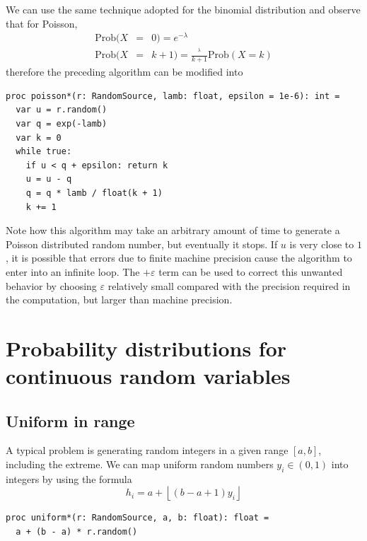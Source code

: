 \documentclass[justified, sixbynine]{tufte-book}
\def\ft{\small\tt}
\theoremstyle{plain}%
\newtheorem * {corollary}{Corollary}
\theoremstyle{definition}
\theoremstyle{remark}
\newtheorem * {remark}{Remark}
\newtheorem * {note}{Note}
\begin{document}
\begin{fullwidth}
We can use the same technique adopted for the
binomial distribution and observe that for Poisson, 
\begin{eqnarray}
\textrm{Prob}(X &=&0)=e^{-\lambda } \\
\textrm{Prob}(X &=&k+1)=\frac{^\lambda }{k+1}\textrm{Prob}(X=k)
\end{eqnarray}
therefore the preceding algorithm can be modified into

\begin{lstlisting}[caption={in file: {\ft nlib.nim}}]
proc poisson*(r: RandomSource, lamb: float, epsilon = 1e-6): int =
  var u = r.random()
  var q = exp(-lamb)
  var k = 0
  while true:
    if u < q + epsilon: return k
    u = u - q
    q = q * lamb / float(k + 1)
    k += 1
\end{lstlisting}

Note how this algorithm may take an arbitrary amount of time to generate a
Poisson distributed random number, but eventually it stops. If $u$ is very
close to $1$, it is possible that errors due to finite machine precision
cause the algorithm to enter into an infinite loop. The $+\varepsilon $ term
can be used to correct this unwanted behavior by choosing $\varepsilon$ relatively small compared with the precision required in the computation, but
larger than machine precision.

\goodbreak\section{Probability distributions for continuous random variables}

\goodbreak\subsection{Uniform in range}

A typical problem is generating random integers in a given range $[a, b]$, 
including the extreme. We can map uniform random numbers $y_i\in (0, 1)$
into integers by using the formula
\begin{equation}
h_i=a+\left\lfloor (b-a+1)y_i\right\rfloor
\end{equation}

\begin{lstlisting}[caption={in file: {\ft nlib.nim}}]
proc uniform*(r: RandomSource, a, b: float): float =
  a + (b - a) * r.random()
\end{lstlisting}


\end{fullwidth}
\end{document}
